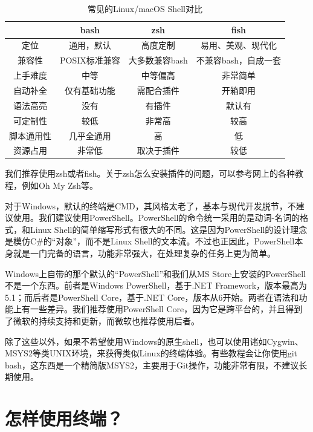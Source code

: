 \begin{table}[ht]
    \centering
    \begin{tabular}{c|ccc}
        \toprule
        & \textbf{bash} & \textbf{zsh} & \textbf{fish} \\
        \midrule
        定位 & 通用，默认 & 高度定制 & 易用、美观、现代化 \\
        兼容性 & POSIX标准兼容 & 大多数兼容bash & 不兼容bash，自成一套 \\
        上手难度 & 中等 & 中等偏高 & 非常简单 \\
        自动补全 & 仅有基础功能 & 需配合插件 & 开箱即用 \\
        语法高亮 & 没有 & 有插件 & 默认有 \\
        可定制性 & 较低 & 非常高 & 较高 \\
        脚本通用性 & 几乎全通用 & 高 & 低 \\
        资源占用 & 非常低 & 取决于插件 & 较低 \\
        \bottomrule
    \end{tabular}
    \caption{常见的Linux/macOS Shell对比}
\end{table}
我们推荐使用zsh或者fish。关于zsh怎么安装插件的问题，可以参考网上的各种教程，例如Oh My Zsh等。

对于Windows，默认的终端是CMD，其风格太老了，基本与现代开发脱节，不建议使用。我们建议使用PowerShell。PowerShell的命令统一采用的是动词-名词的格式，和Linux Shell的简单缩写形式有很大的不同。这是因为PowerShell的设计理念是模仿C\#的“对象”，而不是Linux Shell的文本流。不过也正因此，PowerShell本身就是一门完备的语言，功能非常强大，在处理复杂的任务上更为简单。

\begin{caution}
    Windows上自带的那个默认的“PowerShell”和我们从MS Store上安装的PowerShell不是一个东西。前者是Windows PowerShell，基于.NET Framework，版本最高为5.1；而后者是PowerShell Core，基于.NET Core，版本从6开始。两者在语法和功能上有一些差异。我们推荐使用PowerShell Core，因为它是跨平台的，并且得到了微软的持续支持和更新，而微软也推荐使用后者。
\end{caution}

除了这些以外，如果不希望使用Windows的原生shell，也可以使用诸如Cygwin、MSYS2等类UNIX环境，来获得类似Linux的终端体验。有些教程会让你使用git bash，这东西是一个精简版MSYS2，主要用于Git操作，功能非常有限，不建议长期使用。

\section{怎样使用终端？}

